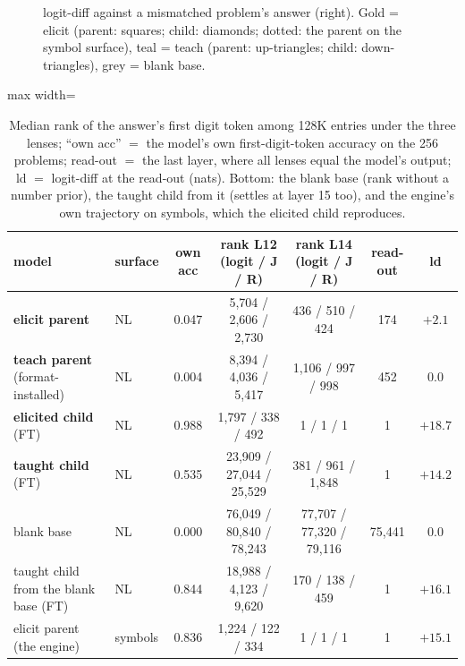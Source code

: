 \documentclass[11pt]{article}
\begin{document}
\begin{enumerate}[label=\textbf{M\arabic*}, leftmargin=*, itemsep=1.2em, resume]
\begin{figure}[h]
{logit-diff against a mismatched problem's answer (right). Gold = elicit (parent: squares; child:
diamonds; dotted: the parent on the symbol surface), teal = teach (parent: up-triangles; child:
down-triangles), grey = blank base.}
\label{fig:lens}
\end{figure}
\begin{table}[h]\centering\small
\begin{adjustbox}{max width=\textwidth}
\begin{tabular}{llccccc}
\toprule
model & surface & own acc & rank L12 (logit / J / R) & rank L14 (logit / J / R) & read-out & ld \\
\midrule
\textbf{elicit parent} & NL & 0.047 & 5{,}704 / 2{,}606 / 2{,}730 & 436 / 510 / 424 & 174 & $+2.1$ \\
\textbf{teach parent} (format-installed) & NL & 0.004 & 8{,}394 / 4{,}036 / 5{,}417 & 1{,}106 / 997 / 998 & 452 & $0.0$ \\
\textbf{elicited child} (FT) & NL & 0.988 & 1{,}797 / 338 / 492 & 1 / 1 / 1 & 1 & $+18.7$ \\
\textbf{taught child} (FT) & NL & 0.535 & 23{,}909 / 27{,}044 / 25{,}529 & 381 / 961 / 1{,}848 & 1 & $+14.2$ \\
\midrule
blank base & NL & 0.000 & 76{,}049 / 80{,}840 / 78{,}243 & 77{,}707 / 77{,}320 / 79{,}116 & 75{,}441 & $0.0$ \\
taught child from the blank base (FT) & NL & 0.844 & 18{,}988 / 4{,}123 / 9{,}620 & 170 / 138 / 459 & 1 & $+16.1$ \\
elicit parent (the engine) & symbols & 0.836 & 1{,}224 / 122 / 334 & 1 / 1 / 1 & 1 & $+15.1$ \\
\bottomrule
\end{tabular}
\end{adjustbox}
\caption{Median rank of the answer's first digit token among 128K entries under the three lenses;
``own acc'' $=$ the model's own first-digit-token accuracy on the 256 problems; read-out $=$ the
last layer, where all lenses equal the model's output; ld $=$ logit-diff at the read-out (nats).
Bottom: the blank base (rank without a number prior), the taught child from it (settles at layer
15 too), and the engine's own trajectory on symbols, which the elicited child reproduces.}
\label{tab:lens}
\end{table}


\end{enumerate}
\end{document}

